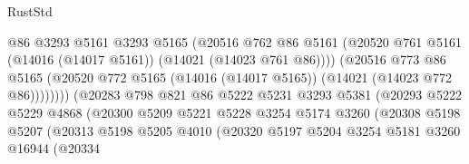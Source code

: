 \begin{lexlean}{RustStd}
\begin{coremodule}
                                      @86
                                      @3293
                                      @5161
                                      @3293
                                      @5165
                                      (@20516
                                        @762
                                        @86
                                        @5161
                                        (@20520
                                          @761
                                          @5161
                                          (@14016 (@14017 @5161))
                                          (@14021 (@14023 @761 @86))))
                                      (@20516
                                        @773
                                        @86
                                        @5165
                                        (@20520
                                          @772
                                          @5165
                                          (@14016 (@14017 @5165))
                                          (@14021 (@14023 @772 @86))))))))
                              (@20283
                                @798
                                @821
                                @86
                                @5222
                                @5231
                                @3293
                                @5381
                                (@20293
                                  @5222
                                  @5229
                                  @4868
                                  (@20300
                                    @5209
                                    @5221
                                    @5228
                                    @3254
                                    @5174
                                    @3260
                                    (@20308
                                      @5198
                                      @5207
                                      (@20313
                                        @5198
                                        @5205
                                        @4010
                                        (@20320
                                          @5197
                                          @5204
                                          @3254
                                          @5181
                                          @3260
                                          @16944
                                          (@20334

\end{coremodule}
\end{lexlean}
